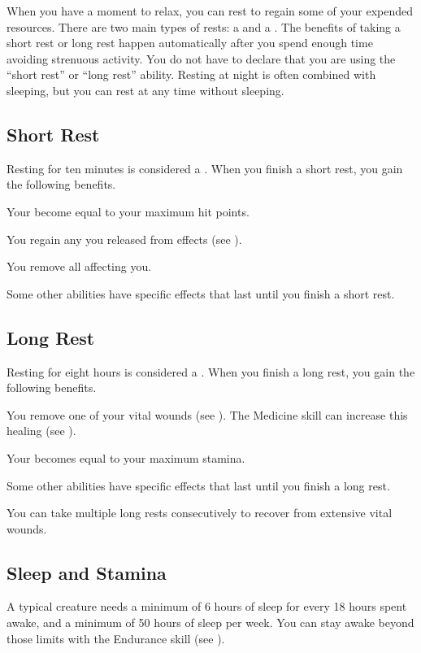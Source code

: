 
  When you have a moment to relax, you can rest to regain some of your expended resources.
  There are two main types of rests: a  and a .
  The benefits of taking a short rest or long rest happen automatically after you spend enough time avoiding strenuous activity.
  You do not have to declare that you are using the ``short rest'' or ``long rest'' ability.
  Resting at night is often combined with sleeping, but you can rest at any time without sleeping.


  \subsection{Short Rest}\label{Short Rest}
    Resting for ten minutes is considered a .
    When you finish a short rest, you gain the following benefits.
    \begin{raggeditemize}
      \item Your  become equal to your maximum hit points.
      \item You regain any  you released from  effects (see ).
      \item You remove all  affecting you.
      \item Some other abilities have specific effects that last until you finish a short rest.
    \end{raggeditemize}

  \subsection{Long Rest}\label{Long Rest}
    Resting for eight hours is considered a .
    When you finish a long rest, you gain the following benefits.
    \begin{raggeditemize}
      \item You remove one of your vital wounds (see ).
        The Medicine skill can increase this healing (see ).
      \item Your  becomes equal to your maximum stamina.
      \item Some other abilities have specific effects that last until you finish a long rest.
    \end{raggeditemize}

    You can take multiple long rests consecutively to recover from extensive vital wounds.

  \subsection{Sleep and Stamina}\label{Sleep and Stamina}
    A typical creature needs a minimum of 6 hours of sleep for every 18 hours spent awake, and a minimum of 50 hours of sleep per week.
    You can stay awake beyond those limits with the Endurance skill (see ).
